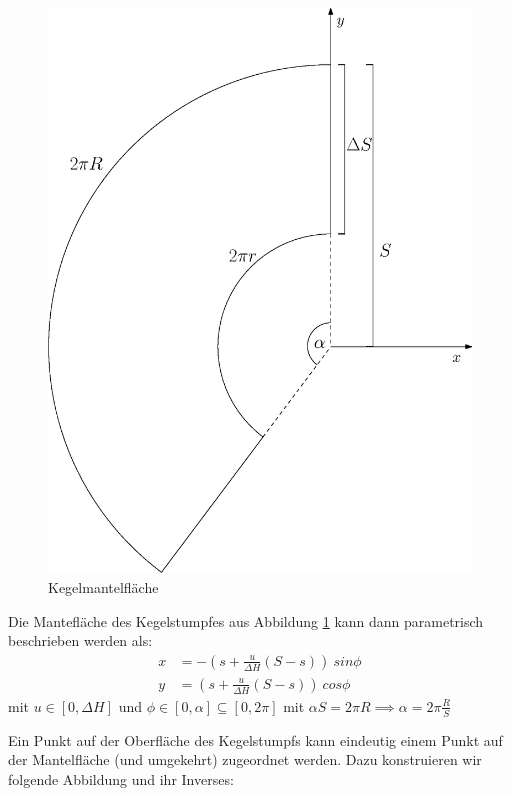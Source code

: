 \begin{figure}[!htb]
	\centering
	\includegraphics[scale=.4]{images/coneLateral.eps}
	\caption{Kegelmantelfläche}
	\label{fig:coneLateral}
\end{figure}

Die Mantefläche des Kegelstumpfes aus Abbildung \ref{fig:coneLateral} kann dann parametrisch beschrieben werden als:
\begin{equation} \label{eq:paramLateral}
\begin{aligned}
x &= -(s + \frac{u}{\Delta H}(S-s)) ~sin \phi \\
y &= (s + \frac{u}{\Delta H} (S-s)) ~cos \phi
\end{aligned}
\end{equation}
mit  $u\in [0, \Delta H]$ und $\phi \in [0, \alpha] \subseteq [0, 2\pi]$ mit $\alpha S = 2\pi R \implies \alpha = 2\pi\frac{R}{S}$

\bigskip

Ein Punkt auf der Oberfläche des Kegelstumpfs kann eindeutig einem Punkt auf der Mantelfläche (und umgekehrt) zugeordnet werden. Dazu konstruieren wir folgende Abbildung und ihr Inverses:

